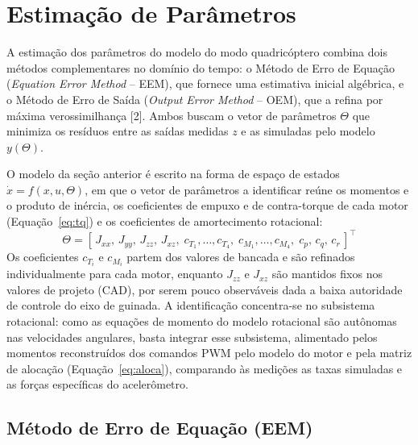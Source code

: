 \documentclass[letterpaper, 10 pt, conference]{ieeeconf}
\begin{document}
\section{Estimação de Parâmetros}

A estimação dos parâmetros do modelo do modo quadricóptero combina dois métodos complementares no domínio do tempo: o Método de Erro de Equação (\textit{Equation Error Method} -- EEM), que fornece uma estimativa inicial algébrica, e o Método de Erro de Saída (\textit{Output Error Method} -- OEM), que a refina por máxima verossimilhança [2]. Ambos buscam o vetor de parâmetros $\Theta$ que minimiza os resíduos entre as saídas medidas $z$ e as simuladas pelo modelo $y(\Theta)$.

O modelo da seção anterior é escrito na forma de espaço de estados $\dot{x} = f(x, u, \Theta)$, em que o vetor de parâmetros a identificar reúne os momentos e o produto de inércia, os coeficientes de empuxo e de contra-torque de cada motor (Equação~\eqref{eq:tq}) e os coeficientes de amortecimento rotacional:
\begin{equation}
\Theta = [\,J_{xx},\,J_{yy},\,J_{zz},\,J_{xz},\;c_{T_1},\dots,c_{T_4},\;c_{M_1},\dots,c_{M_4},\;c_p,\,c_q,\,c_r\,]^{\top}
\label{eq:theta}
\end{equation}
Os coeficientes $c_{T_i}$ e $c_{M_i}$ partem dos valores de bancada e são refinados individualmente para cada motor, enquanto $J_{zz}$ e $J_{xz}$ são mantidos fixos nos valores de projeto (CAD), por serem pouco observáveis dada a baixa autoridade de controle do eixo de guinada. A identificação concentra-se no subsistema rotacional: como as equações de momento do modelo rotacional são autônomas nas velocidades angulares, basta integrar esse subsistema, alimentado pelos momentos reconstruídos dos comandos PWM pelo modelo do motor e pela matriz de alocação (Equação~\eqref{eq:aloca}), comparando às medições as taxas simuladas e as forças específicas do acelerômetro.

\subsection{Método de Erro de Equação (EEM)}
\end{document}
